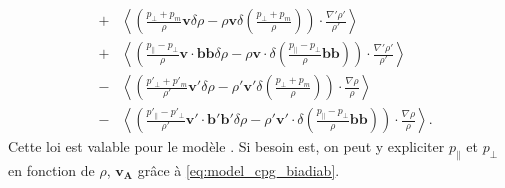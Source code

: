 \begin{equation}
\begin{array}{lcl}
  & +&  \left<  \left(  \frac{p_{\perp}+p_m }{\rho} \boldsymbol{v}\delta \rho - \rho \boldsymbol{v}\delta \left(\frac{ p_{\perp}+p_m }{\rho}\right) \right)\cdot  \frac{\nabla' \rho'}{\rho'} \right>\\
  &+&  \left<  \left(    \frac{ p_{\parallel}-p_{\perp}}{\rho} \boldsymbol{v} \cdot\boldsymbol{b}\boldsymbol{b} \delta \rho -\rho  \boldsymbol{v} \cdot \delta \left(\frac{ p_{\parallel}-p_{\perp}}{\rho}\boldsymbol{b}\boldsymbol{b} \right)  \right)\cdot  \frac{\nabla' \rho'}{\rho'} \right>\\
 &-& \left< \left(  \frac{ p'_{\perp}+p'_m }{\rho'} \boldsymbol{v'}\delta \rho - \rho' \boldsymbol{v'}\delta \left(\frac{ p_{\perp}+p_m }{\rho}\right) \right) \cdot  \frac{\nabla \rho}{\rho} \right>\\
 &-&   \left< \left(  \frac{ p'_{\parallel}-p'_{\perp}}{\rho'}\boldsymbol{v'} \cdot\boldsymbol{b'}\boldsymbol{b'}  \delta \rho - \rho' \boldsymbol{v'} \cdot\delta \left(\frac{ p_{\parallel}-p_{\perp}}{\rho}\boldsymbol{b}\boldsymbol{b} \right)\right) \cdot  \frac{\nabla \rho}{\rho} \right> .
\end{array}%
\end{equation}
Cette loi est valable pour le modèle . Si besoin est, on peut y expliciter $p_{\parallel}$ et $p_{\perp}$ en fonction de $\rho$, $\boldsymbol{v_A}$ grâce à \eqref{eq:model_cpg_biadiab}. 

